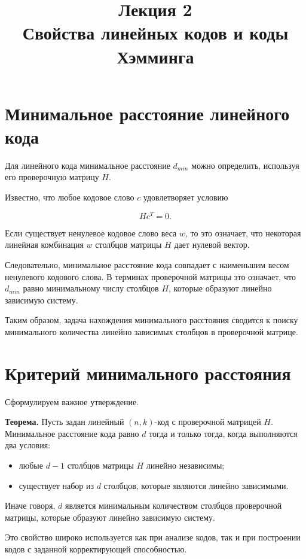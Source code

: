 \documentclass[a4paper,12pt]{article}
\title{Лекция 2 \\ Свойства линейных кодов и коды Хэмминга}
\date{}
\begin{document}
\maketitle

\section{Минимальное расстояние линейного кода}

Для линейного кода минимальное расстояние $d_{min}$ можно определить,
используя его проверочную матрицу $H$.

Известно, что любое кодовое слово $c$ удовлетворяет условию

\[
Hc^T = 0.
\]

Если существует ненулевое кодовое слово веса $w$, то это означает,
что некоторая линейная комбинация $w$ столбцов матрицы $H$
дает нулевой вектор.

Следовательно, минимальное расстояние кода совпадает
с наименьшим весом ненулевого кодового слова.
В терминах проверочной матрицы это означает,
что $d_{min}$ равно минимальному числу столбцов $H$,
которые образуют линейно зависимую систему.

Таким образом, задача нахождения минимального расстояния
сводится к поиску минимального количества линейно зависимых
столбцов в проверочной матрице.

\section{Критерий минимального расстояния}

Сформулируем важное утверждение.

\textbf{Теорема.}
Пусть задан линейный $(n,k)$-код с проверочной матрицей $H$.
Минимальное расстояние кода равно $d$ тогда и только тогда,
когда выполняются два условия:

\begin{itemize}
\item любые $d-1$ столбцов матрицы $H$ линейно независимы;
\item существует набор из $d$ столбцов, которые являются
линейно зависимыми.
\end{itemize}

Иначе говоря, $d$ является минимальным количеством столбцов
проверочной матрицы, которые образуют линейно зависимую систему.

Это свойство широко используется как при анализе кодов,
так и при построении кодов с заданной корректирующей способностью.
\end{document}
